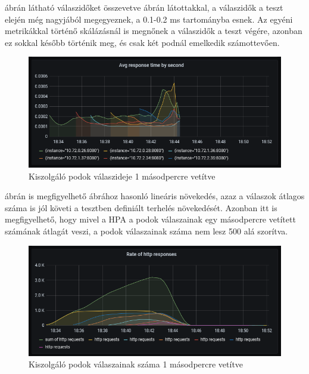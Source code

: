 \documentclass[a4paper,oneside]{article}
\begin{document}
 ábrán látható válaszidőket összevetve
 ábrán látottakkal, a válaszidők a teszt elején
még nagyjából megegyeznek, a 0.1-0.2 ms tartományba esnek.  Az egyéni
metrikákkal történő skálázásnál is megnőnek a válaszidők a teszt végére,
azonban ez sokkal később történik meg, és csak két podnál emelkedik
számottevően.

\begin{figure}[H]
  \centering
  \includegraphics[width=\textwidth]{light_custom_response_time.PNG}
  \caption{Kiszolgáló podok válaszideje 1 másodpercre vetítve}
  \label{light_custom_response_time}  
\end{figure}

 ábrán is megfigyelhető
 ábrához hasonló lineáris növekedés, azaz a válaszok
átlagos száma is jól követi a tesztben definiált terhelés növekedését.
Azonban itt is megfigyelhető, hogy mivel a HPA a podok válaszainak egy
másodpercre vetített számának átlagát veszi, a podok válaszainak száma nem
lesz 500 alá szorítva.

\begin{figure}[H]
  \centering
  \includegraphics[width=\textwidth]{light_custom_response_count.PNG}
  \caption{Kiszolgáló podok válaszainak száma 1 másodpercre vetítve}
  \label{light_custom_response_count}  
\end{figure}
\end{document}
